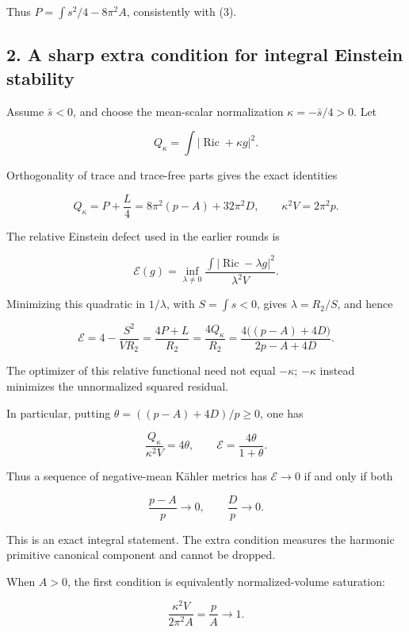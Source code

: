 \documentclass[
  11pt,
]{article}
\begin{document}
Thus \(P=\int s^2/4-8\pi^2A\), consistently with (3).

\hypertarget{a-sharp-extra-condition-for-integral-einstein-stability}{%
\subsection{2. A sharp extra condition for integral Einstein
stability}\label{a-sharp-extra-condition-for-integral-einstein-stability}}

Assume \(\bar s<0\), and choose the mean-scalar normalization
\(\kappa=-\bar s/4>0\). Let

\[
 Q_\kappa=\int|\operatorname{Ric}+\kappa g|^2.
\]

Orthogonality of trace and trace-free parts gives the exact identities

\[
 \boxed{Q_\kappa=P+\frac L4
 =8\pi^2(p-A)+32\pi^2D,\qquad
 \kappa^2 V=2\pi^2p.}
 \tag{7}
\]

The relative Einstein defect used in the earlier rounds is

\[
 \mathcal E(g)=\inf_{\lambda\ne0}
 \frac{\int|\operatorname{Ric}-\lambda g|^2}{\lambda^2 V}.
\]

Minimizing this quadratic in \(1/\lambda\), with \(S=\int s<0\), gives
\(\lambda=R_2/S\), and hence

\[
 \mathcal E=4-\frac{S^2}{V R_2}
 =\frac{4P+L}{R_2}=\frac{4Q_\kappa}{R_2}
 =\boxed{\frac{4\bigl((p-A)+4D\bigr)}{2p-A+4D}}.
 \tag{8}
\]

The optimizer of this relative functional need not equal \(-\kappa\);
\(-\kappa\) instead minimizes the unnormalized squared residual.

In particular, putting \(\theta=((p-A)+4D)/p\ge0\), one has

\[
 \frac{Q_\kappa}{\kappa^2V}=4\theta,
 \qquad \mathcal E=\frac{4\theta}{1+\theta}.
 \tag{9}
\]

Thus a sequence of negative-mean Kähler metrics has \(\mathcal E\to0\)
if and only if both

\[
 \frac{p-A}{p}\longrightarrow0,
 \qquad \frac{D}{p}\longrightarrow0.
 \tag{10}
\]

This is an exact integral statement. The extra condition measures the
harmonic primitive canonical component and cannot be dropped.

When \(A>0\), the first condition is equivalently normalized-volume
saturation:

\[
 \frac{\kappa^2V}{2\pi^2 A}=\frac pA\longrightarrow1.
 \tag{11}
\]
\end{document}
